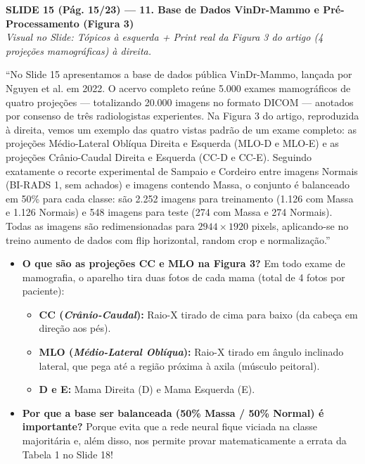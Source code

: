 \documentclass[11pt,a4paper]{article}
\newcommand{\slideheader}[3]{%
    \vspace{10pt}%
    \begin{tcolorbox}[colback=slateborder, colframe=slateborder, coltext=white, boxrule=0pt, arc=3pt, left=8pt, right=8pt, top=5pt, bottom=5pt]
        {\large\bfseries #1 — #2}\\[2pt]
        {\small\itshape Visual no Slide: #3}
    \end{tcolorbox}%
}
\newenvironment{falabox}{%
    \begin{tcolorbox}[colback=speechbg, colframe=speechborder, boxrule=1.2pt, arc=4pt, left=10pt, right=10pt, top=8pt, bottom=8pt, title={\bfseries O QUE VOCÊ DEVE FALAR (Fala Sugerida)}]%
}{%
    \end{tcolorbox}%
}
\newenvironment{explicabox}{%
    \begin{tcolorbox}[colback=explainbg, colframe=explainborder, boxrule=0.8pt, arc=4pt, left=10pt, right=10pt, top=8pt, bottom=8pt, title={\bfseries ENTENDA O QUE VOCÊ ESTÁ FALANDO (Explicação Didática de Cada Termo)}]%
}{%
    \end{tcolorbox}%
}
\begin{document}
\newpage
\slideheader{SLIDE 15 (Pág. 15/23)}{11. Base de Dados VinDr-Mammo e Pré-Processamento (Figura 3)}{Tópicos à esquerda + Print real da Figura 3 do artigo (4 projeções mamográficas) à direita.}

\begin{falabox}
``No Slide 15 apresentamos a base de dados pública VinDr-Mammo, lançada por Nguyen et al. em 2022. O acervo completo reúne 5.000 exames mamográficos de quatro projeções — totalizando 20.000 imagens no formato DICOM — anotados por consenso de três radiologistas experientes. Na Figura 3 do artigo, reproduzida à direita, vemos um exemplo das quatro vistas padrão de um exame completo: as projeções Médio-Lateral Oblíqua Direita e Esquerda (MLO-D e MLO-E) e as projeções Crânio-Caudal Direita e Esquerda (CC-D e CC-E). Seguindo exatamente o recorte experimental de Sampaio e Cordeiro entre imagens Normais (BI-RADS 1, sem achados) e imagens contendo Massa, o conjunto é balanceado em 50\% para cada classe: são 2.252 imagens para treinamento (1.126 com Massa e 1.126 Normais) e 548 imagens para teste (274 com Massa e 274 Normais). Todas as imagens são redimensionadas para $2944 \times 1920$ pixels, aplicando-se no treino aumento de dados com flip horizontal, random crop e normalização.''
\end{falabox}

\begin{explicabox}
\begin{itemize}[leftmargin=*, itemsep=4pt]
    \item \textbf{O que são as projeções CC e MLO na Figura 3?} Em todo exame de mamografia, o aparelho tira duas fotos de cada mama (total de 4 fotos por paciente):
    \begin{itemize}
        \item \textbf{CC (\textit{Crânio-Caudal}):} Raio-X tirado de cima para baixo (da cabeça em direção aos pés).
        \item \textbf{MLO (\textit{Médio-Lateral Oblíqua}):} Raio-X tirado em ângulo inclinado lateral, que pega até a região próxima à axila (músculo peitoral).
        \item \textbf{D e E:} Mama Direita (D) e Mama Esquerda (E).
    \end{itemize}
    \item \textbf{Por que a base ser balanceada (50\% Massa / 50\% Normal) é importante?} Porque evita que a rede neural fique viciada na classe majoritária e, além disso, nos permite provar matematicamente a errata da Tabela 1 no Slide 18!
\end{itemize}
\end{explicabox}
\end{document}

